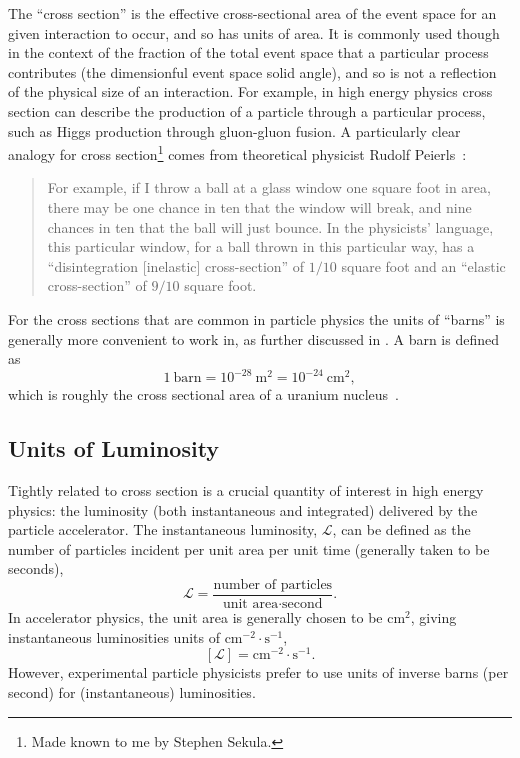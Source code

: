 The ``cross section'' is the effective cross-sectional area of the event space for an given interaction to occur, and so has units of area.
It is commonly used though in the context of the fraction of the total event space that a particular process contributes (the dimensionful event space solid angle), and so is not a reflection of the physical size of an interaction.
For example, in high energy physics cross section can describe the production of a particle through a particular process, such as Higgs production through gluon-gluon fusion.
A particularly clear analogy for cross section\footnote{Made known to me by Stephen Sekula.} comes from theoretical physicist Rudolf Peierls~\cite{rhodes2012making}:
\begin{quote}
 For example, if I throw a ball at a glass window one square foot in area, there may be one chance in ten that the window will break, and nine chances in ten that the ball will just bounce.
 In the physicists' language, this particular window, for a ball thrown in this particular way, has a ``disintegration [inelastic] cross-section'' of $1/10$ square foot and an ``elastic cross-section'' of $9/10$ square foot.
\end{quote}
For the cross sections that are common in particle physics the units of ``barns'' is generally more convenient to work in, as further discussed in .
A barn is defined as
\begin{equation}
 1~\textrm{barn} = 10^{-28}~\textrm{m}^2 = 10^{-24}~\textrm{cm}^2,
 \label{eq:barn_to_area}
\end{equation}
which is roughly the cross sectional area of a uranium nucleus~\cite{web:history_physics_purdue,history:etymology_barn}.

\subsection{Units of Luminosity}\label{subsection:luminosity_units}
Tightly related to cross section is a crucial quantity of interest in high energy physics: the luminosity (both instantaneous and integrated) delivered by the particle accelerator.
The instantaneous luminosity, $\mathscr{L}$, can be defined as the number of particles incident per unit area per unit time (generally taken to be seconds),
\begin{equation}
 \mathscr{L} = \frac{\text{number of particles}}{\text{unit area} \cdot \text{second}}.
 \label{eq:instantaneous_luminosity}
\end{equation}
In accelerator physics, the unit area is generally chosen to be $\textrm{cm}^2$, giving instantaneous luminosities units of $\textrm{cm}^{-2} \cdot \textrm{s}^{-1}$,
\[
 \left[\mathscr{L}\right] = \textrm{cm}^{-2} \cdot \textrm{s}^{-1}.
\]
However, experimental particle physicists prefer to use units of inverse barns (per second) for (instantaneous) luminosities.

